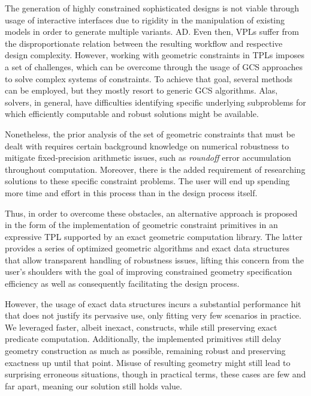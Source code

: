 %
\label{chap:conclusion}
\cleardoublepage{}

\noindent The generation of highly constrained sophisticated designs is not
viable through usage of interactive interfaces due to rigidity in the
manipulation of existing models in order to generate multiple variants.  
\Ac{AD}.  Even then, \acp{VPL} suffer from the disproportionate relation between
the resulting workflow and respective design complexity.  However, working with
geometric constraints in \acp{TPL} imposes a set of challenges, which can be
overcome through the usage of \ac{GCS} approaches to solve complex systems of
constraints.  To achieve that goal, several methods can be employed, but they
mostly resort to generic \acs{GCS} algorithms.  Alas, solvers, in general, have
difficulties identifying specific underlying subproblems for which efficiently
computable and robust solutions might be available.

Nonetheless, the prior analysis of the set of geometric constraints that must be
dealt with requires certain background knowledge on numerical robustness to
mitigate fixed-precision arithmetic issues, such as \textit{roundoff} error
accumulation throughout computation.  Moreover, there is the added requirement
of researching solutions to these specific constraint problems.  The user will
end up spending more time and effort in this process than in the design process
itself.

Thus, in order to overcome these obstacles, an alternative approach is proposed
in the form of the implementation of geometric constraint primitives in an
expressive \ac{TPL} supported by an exact geometric computation library.  The
latter provides a series of optimized geometric algorithms and exact data
structures that allow transparent handling of robustness issues, lifting this
concern from the user's shoulders with the goal of improving constrained
geometry specification efficiency as well as consequently facilitating the
design process.

However, the usage of exact data structures incurs a substantial performance hit
that does not justify its pervasive use, only fitting very few scenarios in
practice.  We leveraged faster, albeit inexact, constructs, while still
preserving exact predicate computation.  Additionally, the implemented
primitives still delay geometry construction as much as possible, remaining
robust and preserving exactness up until that point.  Misuse of resulting
geometry might still lead to surprising erroneous situations, though in
practical terms, these cases are few and far apart, meaning our solution still
holds value.

